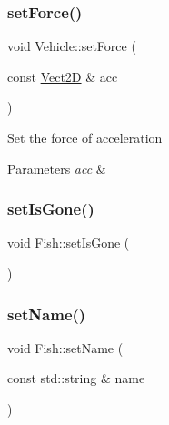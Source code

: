 \mbox{\label{classVehicle_a03e22c522e6f526f95428c81d0762833_a03e22c522e6f526f95428c81d0762833}} 
\subsubsection{\texorpdfstring{set\+Force()}{setForce()}}
{\footnotesize\ttfamily void Vehicle\+::set\+Force (\begin{DoxyParamCaption}\item[{const \hyperlink{classVect2D}{Vect2D} \&}]{acc }\end{DoxyParamCaption})\hspace{0.3cm}{\ttfamily [inherited]}}

Set the force of acceleration 
\begin{DoxyParams}{Parameters}
{\em acc} & \\
\hline
\end{DoxyParams}
\mbox{\label{classFish_ad7d3a39831fa4a170a63dde98474b728_ad7d3a39831fa4a170a63dde98474b728}} 
\subsubsection{\texorpdfstring{set\+Is\+Gone()}{setIsGone()}}
{\footnotesize\ttfamily void Fish\+::set\+Is\+Gone (\begin{DoxyParamCaption}{ }\end{DoxyParamCaption})\hspace{0.3cm}{\ttfamily [inherited]}}

\mbox{\label{classFish_a27a489adca6d1dc91b011ee97f36ae75_a27a489adca6d1dc91b011ee97f36ae75}} 
\subsubsection{\texorpdfstring{set\+Name()}{setName()}}
{\footnotesize\ttfamily void Fish\+::set\+Name (\begin{DoxyParamCaption}\item[{const std\+::string \&}]{name }\end{DoxyParamCaption})\hspace{0.3cm}{\ttfamily [inherited]}}

